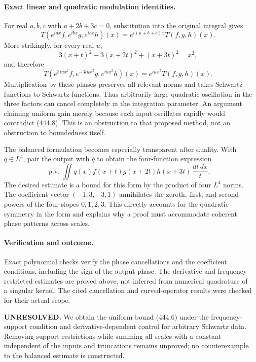 \documentclass[11pt]{article}
\begin{document}
\paragraph{Exact linear and quadratic modulation identities.}
For real $a,b,c$ with $a+2b+3c=0$, substitution into the original integral gives
\[
 T(e^{iax}f,e^{ibx}g,e^{icx}h)(x)
 =e^{i(a+b+c)x}T(f,g,h)(x). \tag{444.7}
\]
More strikingly, for every real $u$,
\[
 3(x+t)^2-3(x+2t)^2+(x+3t)^2=x^2,
\]
and therefore
\[
 T(e^{3iux^2}f,e^{-3iux^2}g,e^{iux^2}h)(x)
 =e^{iux^2}T(f,g,h)(x). \tag{444.8}
\]
Multiplication by these phases preserves all relevant norms and takes Schwartz functions to Schwartz functions. Thus arbitrarily large quadratic oscillation in the three factors can cancel completely in the integration parameter. An argument claiming uniform gain merely because each input oscillates rapidly would contradict (444.8). This is an obstruction to that proposed method, not an obstruction to boundedness itself.

The balanced formulation becomes especially transparent after duality. With $q\in L^4$, pair the output with $\overline q$ to obtain the four-function expression
\[
 \operatorname{p.v.}\iint
 \overline{q(x)}f(x+t)g(x+2t)h(x+3t)\,\frac{dt\,dx}{t}.
 \tag{444.9}
\]
The desired estimate is a bound for this form by the product of four $L^4$ norms. The coefficient vector $(-1,3,-3,1)$ annihilates the zeroth, first, and second powers of the four slopes $0,1,2,3$. This directly accounts for the quadratic symmetry in the form and explains why a proof must accommodate coherent phase patterns across scales.

\paragraph{Verification and outcome.}
Exact polynomial checks verify the phase cancellations and the coefficient conditions, including the sign of the output phase. The derivative and frequency-restricted estimates are proved above, not inferred from numerical quadrature of a singular kernel. The cited cancellation and curved-operator results were checked for their actual scope.

\textbf{UNRESOLVED.} We obtain the uniform bound (444.6) under the frequency-support condition and derivative-dependent control for arbitrary Schwartz data. Removing support restrictions while summing all scales with a constant independent of the inputs and truncations remains unproved; no counterexample to the balanced estimate is constructed.
\end{document}
